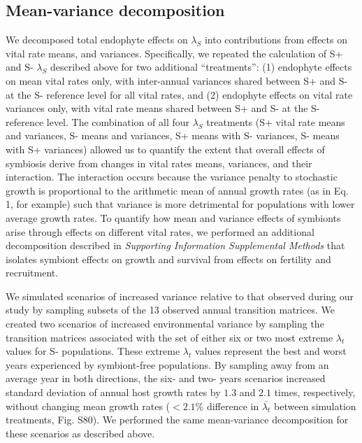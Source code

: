\documentclass[lineno, sn-basic]{sn-jnl}%
\begin{document}
\subsection*{Mean-variance decomposition}
We decomposed total endophyte effects on $\lambda_S$ into contributions from effects on vital rate means, and variances. 
Specifically, we repeated the calculation of S+ and S- $\lambda_S$ described above for two additional ``treatments'': (1) endophyte effects on mean vital rates only, with inter-annual variances shared between S+ and S- at the S- reference level for all vital rates, and (2) endophyte effects on vital rate variances only, with vital rate means shared between S+ and S- at the S- reference level. 
The combination of all four $\lambda_S$ treatments (S+ vital rate means and variances, S- means and variances, S+ means with S- variances, S- means with S+ variances) allowed us to quantify the extent that overall effects of symbiosis derive from changes in vital rates means, variances, and their interaction. 
The interaction occurs because the variance penalty to stochastic growth is proportional to the arithmetic mean of annual growth rates (as in Eq. 1, for example) such that variance is more detrimental for populations with lower average growth rates. 
To quantify how mean and variance effects of symbionts arise through effects on different vital rates, we performed an additional decomposition described in \emph{Supporting Information Supplemental Methods} that isolates symbiont effects on growth and survival from effects on fertility and recruitment.

We simulated scenarios of increased variance relative to that observed during our study by sampling subsets of the 13 observed annual transition matrices. 
We created two scenarios of increased environmental variance by sampling the transition matrices associated with the set of either six or two most extreme $\lambda_{t}$ values for S- populations. 
These extreme $\lambda_{t}$ values represent the best and worst years experienced by symbiont-free populations. 
By sampling away from an average year in both directions, the six- and two- years scenarios increased standard deviation of annual host growth rates by $1.3$ and $2.1$ times, respectively, without changing mean growth rates ($<2.1$\% difference in $\overline{\lambda_{t}}$ between simulation treatments, Fig. S80).
We performed the same mean-variance decomposition for these scenarios as described above. 
\end{document}
